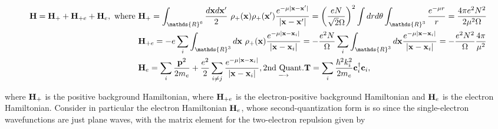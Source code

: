 \documentclass{homework}
\begin{document}
\begin{equation}
\begin{split}
    {\bf H}= {\bf H}_{+} + {\bf H}_{+e} + {\bf H}_{e}, \textnormal{ where } 
         & {\bf H}_+ = \int_{\mathds{R}^6} \frac{d{\bf x} d{\bf x}'}{2} \blanky \rho_{+}({\bf x}) \rho_{+}({\bf x}') \frac{e^{-\mu |{\bf x}-{\bf x}'|}}{|{\bf x} - {\bf x}'|} = \bigg(\frac{eN}{\sqrt{2}\Omega}\bigg)^2 \int dr d\theta \int_{\mathds{R}^3} \frac{e^{-{\mu} r}}{r} = \frac{4\pi e^2 N^2}{2\mu^2\Omega}\\
         &{\bf H}_{+e} = - e\sum_{i} \int_{\mathds{R}^3} d{\bf x} \blanky \rho_{+}({\bf x}) \frac{e^{-\mu |{\bf x}-{\bf x}_i|}}{|{\bf x}-{\bf x}_i|} = -\frac{e^2 N}{\Omega} \sum_{i} \int_{\mathds{R}^3} d{\bf x} \frac{e^{-\mu |{\bf x}-{\bf x}_i|}}{|{\bf x}-{\bf x}_i|} = - \frac{e^2 N^2}{\Omega} \frac{4\pi}{\mu^2}\\
         &{\bf H}_e = \sum_{i} \frac{{\bf p}^2}{2m_e} + \frac{e^2}{2} \sum_{i\neq j}\frac{e^{-\mu |{\bf x}-{\bf x}_i|}}{|{\bf x}-{\bf x}_i|}, \underset{\longrightarrow}{\textnormal{2nd Quant.}} {\bf T} = \sum_{i} \frac{\hbar^2 k_i^2}{2m_e} {\bf c}_i^\dagger {\bf c}_i,
\end{split}
\end{equation}

where ${\bf H}_+$ is the positive background Hamiltonian, where ${\bf H}_{+e}$ is the electron-positive background Hamiltonian and ${\bf H}_e$ is the electron Hamiltonian. Consider in particular the electron Hamiltonian ${\bf H}_e$, whose second-quantization form is so since the single-electron wavefunctions are just plane waves, with the matrix element for the two-electron repulsion given by 
\end{document}
